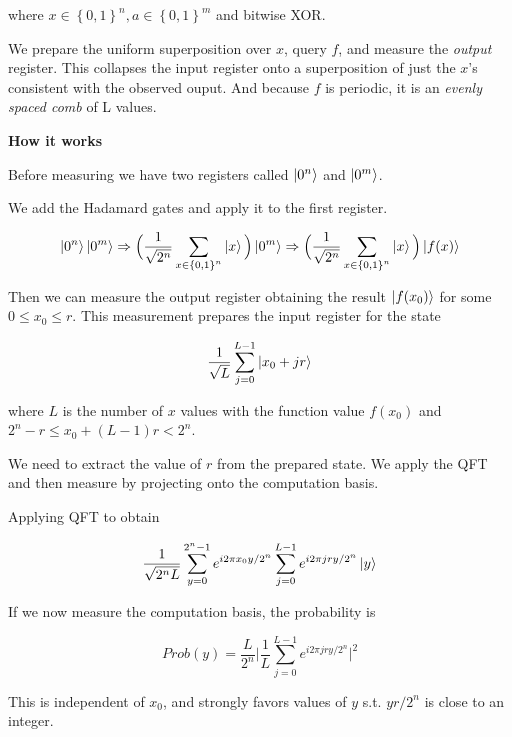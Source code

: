 \documentclass[11pt]{article}
\begin{document}
where $x \in \left\{ 0,1 \right\}^n, a \in \left\{ 0,1 \right\}^m$ and bitwise XOR.

We prepare the uniform superposition over $x$, query $f$, and measure the \textit{output} register. This collapses the input register onto a superposition of just the $x$'s consistent with the observed ouput. And because $f$ is periodic, it is an \textit{evenly spaced comb} of L values.

\textbf{How it works}

Before measuring we have two registers called $\ket{0^n}$ and $\ket{0^m}$.

We add the Hadamard gates and apply it to the first register.

\begin{equation*}
	\ket{0^n}\ket{0^m} \Rightarrow \Big(\frac{1}{\sqrt{2^n}}\sum_{x \in \left\{ 0,1 \right\}^n}\ket{x}\Big)\ket{0^m} \Rightarrow \Big(\frac{1}{\sqrt{2^n}}\sum_{x \in \left\{ 0,1 \right\}^n}\ket{x}\Big)\ket{f(x)}
\end{equation*}

Then we can measure the output register obtaining the result $\ket{f(x_0)}$ for some $0 \le x_0 \le r$. This measurement prepares the input register for the state

\begin{equation*}
	\frac{1}{\sqrt{L}} \sum_{j=0}^{L-1} \ket{x_0+jr}
\end{equation*}

where $L$ is the number of $x$ values with the function value $f(x_0)$ and $2^n-r \le x_0 + (L-1)r < 2^n$.

We need to extract the value of $r$ from the prepared state. We apply the QFT and then measure by projecting onto the computation basis.

Applying QFT to obtain

\begin{equation*}
	\frac{1}{\sqrt{2^nL}} \sum_{y=0}^{2^n-1} e^{i2{\pi}x_0y/2^n} \sum_{j=0}^{L-1}e^{i2{\pi}jry/2^n}\ket{y}
\end{equation*}

If we now measure the computation basis, the probability is

\begin{equation*}
	Prob(y) = \frac{L}{2^n} \Big| \frac1L \sum_{j=0}^{L-1} e^{i2\pi jry/2^n} \Big|^2
\end{equation*}

This is independent of $x_0$, and strongly favors values of $y$ s.t. $yr/2^n$ is close to an integer.
\end{document}
